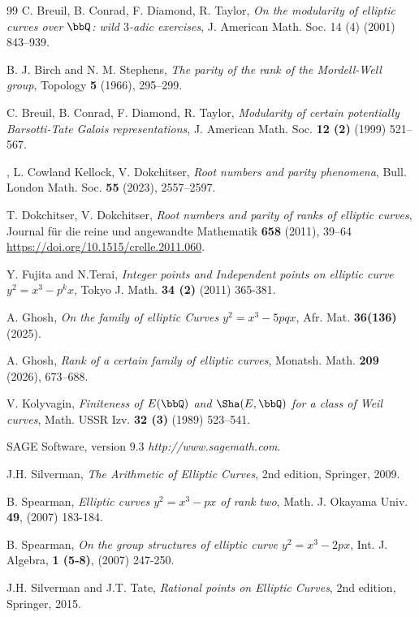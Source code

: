 \begin{thebibliography}{99}
C. Breuil, B. Conrad, F. Diamond, R. Taylor,
\emph{On the modularity of elliptic curves over $\bbQ$: wild $3$-adic exercises},
J. American Math. Soc. {14 (4)} (2001) 843--939.

B. J. Birch and N. M. Stephens,
\emph{The parity of the rank of the Mordell-Well group},
Topology {\bf 5} (1966), 295--299.

C. Breuil, B. Conrad, F. Diamond, R. Taylor,
\emph{Modularity of certain potentially Barsotti-Tate Galois representations},
J. American Math. Soc. {\bf 12 (2)} (1999) 521--567.

,
L. Cowland Kellock, V. Dokchitser,
\emph{Root numbers and parity phenomena},
Bull. London Math. Soc. {\bf 55} (2023), 2557--2597.

T. Dokchitser, V. Dokchitser,
\emph{Root numbers and parity of ranks of elliptic curves},
Journal f\"{u}r die reine und angewandte Mathematik {\bf 658} (2011), 39--64
\url{https://doi.org/10.1515/crelle.2011.060}.

Y. Fujita and N.Terai, 
\emph{Integer points and Independent points on elliptic curve $y^{2} = x^{3}- p^{k}x$}, 
Tokyo J. Math. {\bf 34 (2)} (2011) 365-381.


A. Ghosh, 
\emph{On the family of elliptic Curves $y^{2} =x^{3} -5pqx$}, 
Afr. Mat. {\bf 36(136)} (2025).



A. Ghosh,
\emph{Rank of a certain family of elliptic curves},
Monatsh. Math. {\bf 209} (2026), 673--688.


V. Kolyvagin,
\emph{Finiteness of $E(\bbQ)$ and $\Sha(E,\bbQ)$ for a class of Weil curves},
Math. USSR Izv. {\bf 32 (3)} (1989) 523--541.


SAGE Software, version 9.3
\textit{http://www.sagemath.com}.


J.H. Silverman,
\emph{The Arithmetic of Elliptic Curves},
2nd edition, Springer, 2009.

 B. Spearman, \emph{Elliptic curves $y^{2} = x^{3} -px$ of rank two}, 
Math. J. Okayama Univ. {\bf 49}, (2007) 183-184.

 B. Spearman, \emph{On the group structures of elliptic curve $y^{2} = x^{3} -2px$}, 
Int. J. Algebra, {\bf 1 (5-8)}, (2007) 247-250.


J.H. Silverman and J.T. Tate,
\emph{Rational points on Elliptic Curves},
2nd edition, Springer, 2015.
\end{thebibliography}
